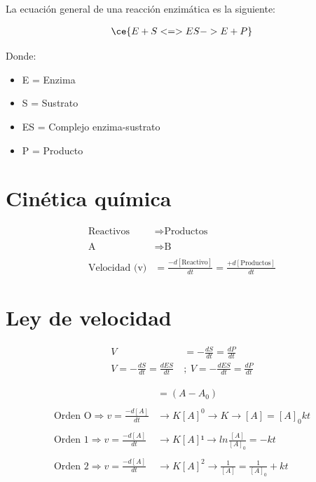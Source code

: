 




La ecuación general de una reacción enzimática es la siguiente:

\begin{align*}
    \ce{E + S <=> ES -> E + P}
\end{align*}

Donde:

\begin{itemize}
    \item E = Enzima
    \item S = Sustrato
    \item ES = Complejo enzima-sustrato
    \item P = Producto
\end{itemize}

\section{Cinética química}

\begin{align*}
    \text{Reactivos} &\Longrightarrow \text{Productos} 
    \\
    \\
    \text{A} &\Longrightarrow \text{B}
    \\
    \\
    \text{Velocidad (v)} &= \frac{-d[\text{Reactivo}]}{dt}=\frac{+d[\text{Productos}]}{dt}
\end{align*}

\section{Ley de velocidad}

\begin{align*}
    V &= -\frac{dS}{dt} = \frac{dP}{dt}
    \\
    V = -\frac{dS}{dt} = \frac{dES}{dt} \ &; \ V = -\frac{dES}{dt} = \frac{dP}{dt}
\end{align*}

\begin{align*}
    [A] &= (A-A_0)
    \\
    \\
    \text{Orden O} \Longrightarrow v = \frac{-d[A]}{dt} &\rightarrow K[A]^0 \rightarrow K \rightarrow [A] = [A]_0kt
    \\
    \\
    \text{Orden 1} \Longrightarrow v = \frac{-d[A]}{dt} &\rightarrow K[A]¹
    \rightarrow ln \frac{[A]}{[A]_0} = -kt
    \\
    \\
    \text{Orden 2} \Longrightarrow v = \frac{-d[A]}{dt} &\rightarrow K[A]^2 \rightarrow \frac{1}{[A]} = \frac{1}{[A]_0} + kt
\end{align*}

